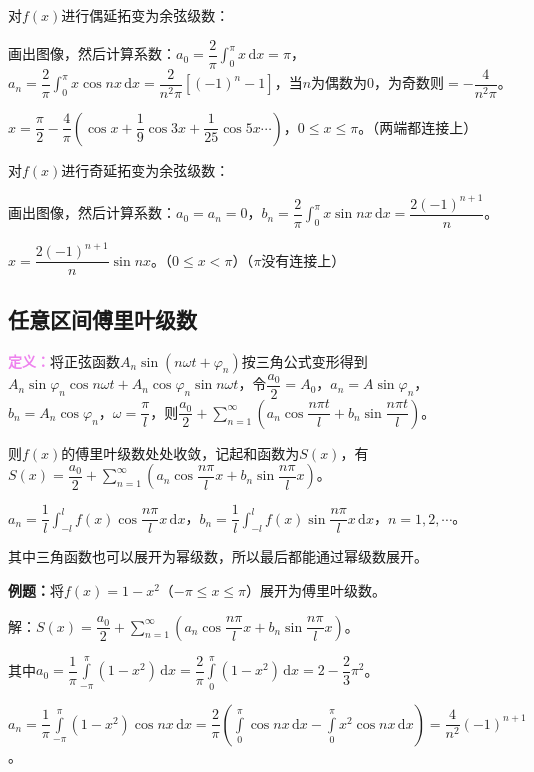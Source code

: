 \documentclass[UTF8, 12pt]{ctexart}
\begin{document}
        对$f(x)$进行偶延拓变为余弦级数：

        画出图像，然后计算系数：$a_0=\dfrac{2}{\pi}\int_0^\pi x\,\textrm{d}x=\pi$，$a_n=\dfrac{2}{\pi}\int_0^\pi x\cos nx\,\textrm{d}x=\dfrac{2}{n^2\pi}[(-1)^n-1]$，当$n$为偶数为0，为奇数则$=-\dfrac{4}{n^2\pi}$。

        $x=\dfrac{\pi}{2}-\dfrac{4}{\pi}\left(\cos x+\dfrac{1}{9}\cos3x+\dfrac{1}{25}\cos5x\cdots\right)$，$0\leqslant x\leqslant\pi$。（两端都连接上）

        对$f(x)$进行奇延拓变为余弦级数：

        画出图像，然后计算系数：$a_0=a_n=0$，$b_n=\dfrac{2}{\pi}\int_0^\pi x\sin nx\,\textrm{d}x=\dfrac{2(-1)^{n+1}}{n}$。

        $x=\dfrac{2(-1)^{n+1}}{n}\sin nx$。（$0\leqslant x<\pi$）（$\pi$没有连接上）

        \subsection{任意区间傅里叶级数}

        \textcolor{violet}{\textbf{定义：}}将正弦函数$A_n\sin(n\omega t+\varphi_n)$按三角公式变形得到$A_n\sin\varphi_n\cos n\omega t+A_n\cos\varphi_n\sin n\omega t$，令$\dfrac{a_0}{2}=A_0$，$a_n=A\sin\varphi_n$，$b_n=A_n\cos\varphi_n$，$\omega=\dfrac{\pi}{l}$，则$\dfrac{a_0}{2}+\sum\limits_{n=1}^\infty\left(a_n\cos\dfrac{n\pi t}{l}+b_n\sin\dfrac{n\pi t}{l}\right)$。

        则$f(x)$的傅里叶级数处处收敛，记起和函数为$S(x)$，有$S(x)=\dfrac{a_0}{2}+\sum\limits_{n=1}^\infty\left(a_n\cos\dfrac{n\pi}{l}x+b_n\sin\dfrac{n\pi}{l}x\right)$。

        $\displaystyle{a_n=\dfrac{1}{l}\int_{-l}^lf(x)\cos\dfrac{n\pi}{l}x\,\textrm{d}x}$，$\displaystyle{b_n=\dfrac{1}{l}\int_{-l}^lf(x)\sin\dfrac{n\pi}{l}x\,\textrm{d}x}$，$n=1,2,\cdots$。

        其中三角函数也可以展开为幂级数，所以最后都能通过幂级数展开。

        \textbf{例题：}将$f(x)=1-x^2$（$-\pi\leqslant x\leqslant\pi$）展开为傅里叶级数。

        解：$S(x)=\dfrac{a_0}{2}+\sum\limits_{n=1}^\infty\left(a_n\cos\dfrac{n\pi}{l}x+b_n\sin\dfrac{n\pi}{l}x\right)$。

        其中$a_0=\dfrac{1}{\pi}\int\limits_{-\pi}^\pi(1-x^2)\,\textrm{d}x=\dfrac{2}{\pi}\int\limits_0^\pi(1-x^2)\,\textrm{d}x=2-\dfrac{2}{3}\pi^2$。

        $a_n=\dfrac{1}{\pi}\int\limits_{-\pi}^\pi(1-x^2)\cos nx\,\textrm{d}x=\dfrac{2}{\pi}(\int\limits_0^\pi\cos nx\,\textrm{d}x-\int\limits_0^\pi x^2\cos nx\,\textrm{d}x)=\dfrac{4}{n^2}(-1)^{n+1}$。
\end{document}

